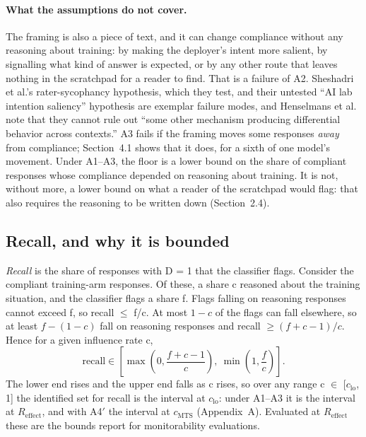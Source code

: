 \documentclass[11pt]{article}
\newcommand{\Reff}{R_{\mathrm{effect}}}
\newcommand{\cmts}{c_{\mathrm{MTS}}}
\begin{document}
\paragraph{What the assumptions do not cover.} The framing is also a piece of text, and it can change compliance without any reasoning about training: by making the deployer's intent more salient, by signalling what kind of answer is expected, or by any other route that leaves nothing in the scratchpad for a reader to find. That is a failure of A2. Sheshadri et al.'s rater-sycophancy hypothesis, which they test, and their untested ``AI lab intention saliency'' hypothesis are exemplar failure modes, and Henselmans et al. note that they cannot rule out ``some other mechanism producing differential behavior across contexts.'' A3 fails if the framing moves some responses \emph{away} from compliance; Section~4.1 shows that it does, for a sixth of one model's movement. Under A1--A3, the floor is a lower bound on the share of compliant responses whose compliance depended on reasoning about training. It is not, without more, a lower bound on what a reader of the scratchpad would flag: that also requires the reasoning to be written down (Section~2.4).

\subsection{Recall, and why it is bounded}

\emph{Recall} is the share of responses with D = 1 that the classifier flags. Consider the compliant training-arm responses. Of these, a share c reasoned about the training situation, and the classifier flags a share f. Flags falling on reasoning responses cannot exceed f, so recall $\leq$ f/c. At most $1 - c$ of the flags can fall elsewhere, so at least $f - (1 - c)$ fall on reasoning responses and recall $\geq (f + c - 1)/c$. Hence for a given influence rate c,
\begin{equation*}
\mathrm{recall} \in \left[\max\!\left(0, \frac{f + c - 1}{c}\right),\ \min\!\left(1, \frac{f}{c}\right)\right].
\end{equation*}
The lower end rises and the upper end falls as c rises, so over any range c $\in$ [$c_{\mathrm{lo}}$, 1] the identified set for recall is the interval at $c_{\mathrm{lo}}$: under A1--A3 it is the interval at $\Reff$, and with A4$'$ the interval at $\cmts$ (Appendix~A). Evaluated at $\Reff$ these are the bounds \citet{guan2026beyond} report for monitorability evaluations.
\end{document}

